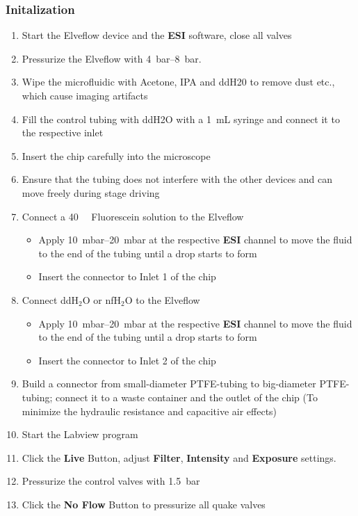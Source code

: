 \documentclass{article}
\newcounter{ListCounter}
\begin{document}
	\subsubsection{Initalization}
	\begin{enumerate}
	\item Start the Elveflow device and the \textbf{ESI} software, close all valves
	\item Pressurize the Elveflow with \SIrange{4}{8}{\bar}.
	\item Wipe the microfluidic with Acetone, IPA and ddH20 to remove dust etc., which cause imaging artifacts
	\item 	Fill the control tubing with ddH2O with a \SI{1}{\milli\liter} syringe and connect it to the respective inlet
	\item 	Insert the chip carefully into the microscope
	\item 	Ensure that the tubing does not interfere with the other devices and can move freely during stage driving
	\item Connect a \SI{40}{\micro\molar} Fluorescein solution to the Elveflow
	\begin{itemize}
		\item Apply \SIrange{10}{20}{\milli\bar} at the respective \textbf{ESI} channel to move the fluid to the end of the tubing until a drop starts to form
		\item  Insert the connector to Inlet 1 of the chip
	\end{itemize}

	\item Connect ddH$_{2}$O or nfH$_{2}$O to the Elveflow		\begin{itemize}
		\item Apply \SIrange{10}{20}{\milli\bar} at the respective \textbf{ESI} channel to move the fluid to the end of the tubing until a drop starts to form
		\item  Insert the connector to Inlet 2 of the chip
	\end{itemize}
	\item Build a connector from small-diameter PTFE-tubing to big-diameter PTFE-tubing; connect it to a waste container and the outlet of the chip (To minimize the hydraulic resistance and capacitive air effects)
	\item Start the Labview program
	\item Click the \textbf{Live} Button, adjust \textbf{Filter}, \textbf{Intensity} and \textbf{Exposure} settings.
	\item Pressurize the control valves with \SI{1.5}{\bar}
	\item Click the \textbf{No Flow} Button to pressurize all quake valves
	\setcounter{ListCounter}{\value{enumi}}
		\end{enumerate}
	
\end{document}
